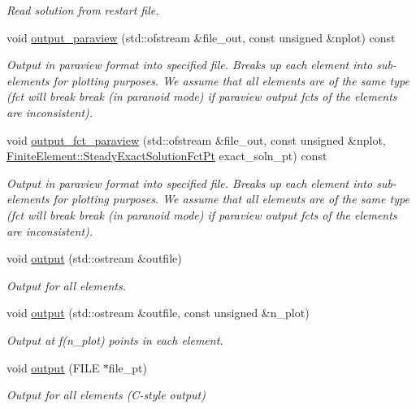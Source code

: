 \begin{DoxyCompactItemize}
\begin{DoxyCompactList}\small\item\em Read solution from restart file. \end{DoxyCompactList}\item 
void \hyperlink{classoomph_1_1Mesh_af62d80c53dc07390d8f62ed180ab6d3a}{output\+\_\+paraview} (std\+::ofstream \&file\+\_\+out, const unsigned \&nplot) const
\begin{DoxyCompactList}\small\item\em Output in paraview format into specified file. Breaks up each element into sub-\/elements for plotting purposes. We assume that all elements are of the same type (fct will break break (in paranoid mode) if paraview output fcts of the elements are inconsistent). \end{DoxyCompactList}\item 
void \hyperlink{classoomph_1_1Mesh_a8bba347dea4098f0bf7142db582adc38}{output\+\_\+fct\+\_\+paraview} (std\+::ofstream \&file\+\_\+out, const unsigned \&nplot, \hyperlink{classoomph_1_1FiniteElement_a690fd33af26cc3e84f39bba6d5a85202}{Finite\+Element\+::\+Steady\+Exact\+Solution\+Fct\+Pt} exact\+\_\+soln\+\_\+pt) const
\begin{DoxyCompactList}\small\item\em Output in paraview format into specified file. Breaks up each element into sub-\/elements for plotting purposes. We assume that all elements are of the same type (fct will break break (in paranoid mode) if paraview output fcts of the elements are inconsistent). \end{DoxyCompactList}\item 
void \hyperlink{classoomph_1_1Mesh_aab74388e8e21325f3ca26f1bd99c26f7}{output} (std\+::ostream \&outfile)
\begin{DoxyCompactList}\small\item\em Output for all elements. \end{DoxyCompactList}\item 
void \hyperlink{classoomph_1_1Mesh_acdd7ba97e7b862988955fd0c4766ba4d}{output} (std\+::ostream \&outfile, const unsigned \&n\+\_\+plot)
\begin{DoxyCompactList}\small\item\em Output at f(n\+\_\+plot) points in each element. \end{DoxyCompactList}\item 
void \hyperlink{classoomph_1_1Mesh_a8d2a1aa08f3a7912c5e3f2d5f30e0110}{output} (F\+I\+LE $\ast$file\+\_\+pt)
\begin{DoxyCompactList}\small\item\em Output for all elements (C-\/style output) \end{DoxyCompactList}\item 

\end{DoxyCompactItemize}
